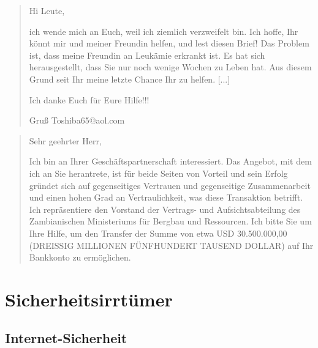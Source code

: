 
\begin{frame}
\begin{quotation}
Hi Leute,

ich wende mich an Euch, weil ich ziemlich verzweifelt bin. Ich hoffe, Ihr könnt mir und meiner Freundin helfen, und lest diesen Brief! Das Problem ist, dass meine Freundin an Leukämie erkrankt ist. Es hat sich herausgestellt, dass Sie nur noch wenige Wochen zu Leben hat. Aus diesem Grund seit Ihr meine letzte Chance Ihr zu helfen. 
[...]

Ich danke Euch für Eure Hilfe!!!

Gruß Toshiba65@aol.com
\end{quotation}
\end{frame}


\begin{frame}
\begin{quotation}
Sehr geehrter Herr,

Ich bin an Ihrer Geschäftspartnerschaft interessiert. Das Angebot, mit dem ich an Sie herantrete, ist für beide Seiten von Vorteil und sein Erfolg gründet sich auf gegenseitiges Vertrauen und gegenseitige Zusammenarbeit und einen hohen Grad an Vertraulichkeit, was diese Transaktion betrifft. Ich repräsentiere den Vorstand der Vertrags- und Aufsichtsabteilung des Zambianischen Ministeriums für Bergbau und Ressourcen. Ich bitte Sie um Ihre Hilfe, um den Transfer der Summe von etwa USD 30.500.000,00 (DREISSIG MILLIONEN FÜNFHUNDERT TAUSEND DOLLAR) auf Ihr Bankkonto zu ermöglichen.
\end{quotation}
\end{frame}

\section{Sicherheitsirrtümer}

\subsection{Internet-Sicherheit}

